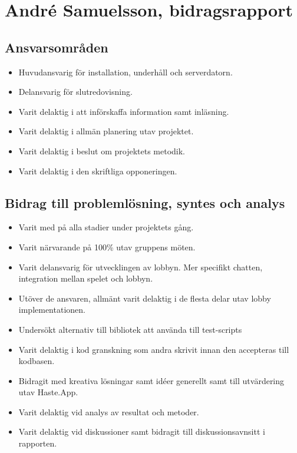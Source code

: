 
\section{André Samuelsson, bidragsrapport}
\subsection{Ansvarsområden}
\begin{itemize}
  \item Huvudansvarig för installation, underhåll och serverdatorn.
  \item Delansvarig för slutredovisning.
  \item Varit delaktig i att införskaffa information samt inläsning.
  \item Varit delaktig i allmän planering utav projektet.
  \item Varit delaktig i beslut om projektets metodik.
  \item Varit delaktig i den skriftliga opponeringen.
\end{itemize}

\subsection{Bidrag till problemlösning, syntes och analys}
\begin{itemize}
  \item Varit med på alla stadier under projektets gång.
  \item Varit närvarande på 100\% utav gruppens möten.

  \item Varit delansvarig för utvecklingen av lobbyn. Mer specifikt chatten, integration mellan spelet och lobbyn. 
  \item Utöver de ansvaren, allmänt varit delaktig i de flesta delar utav lobby implementationen.

  \item Undersökt alternativ till bibliotek att använda till test-scripts
  \item Varit delaktig i kod granskning som andra skrivit innan den accepteras till kodbasen.

  \item Bidragit med kreativa lösningar samt idéer generellt samt till utvärdering utav Haste.App.
  \item Varit delaktig vid analys av resultat och metoder.
  \item Varit delaktig vid diskussioner samt bidragit till diskussionsavnsitt i rapporten.
\end{itemize}


